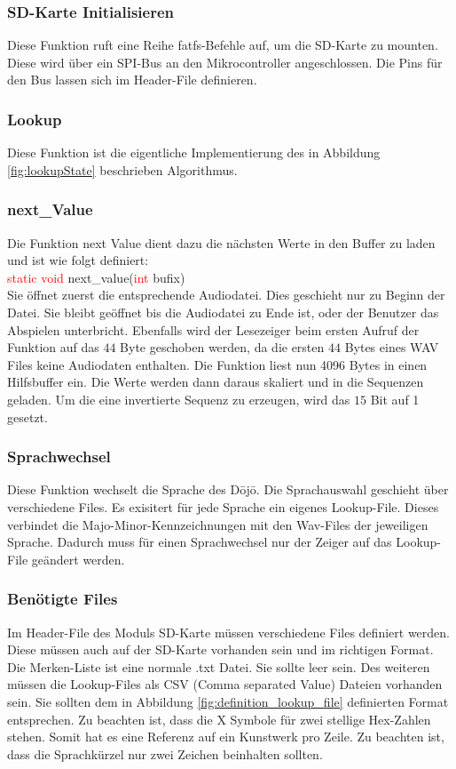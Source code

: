 \subsubsection*{SD-Karte Initialisieren}
Diese Funktion ruft eine Reihe fatfs-Befehle auf, um die SD-Karte zu mounten. Diese wird über ein SPI-Bus an den Mikrocontroller angeschlossen. Die Pins für den Bus lassen sich im Header-File definieren.

\subsubsection*{Lookup}
Diese Funktion ist die eigentliche Implementierung des in Abbildung \ref{fig:lookupState} beschrieben Algorithmus.

\subsubsection*{next\_Value}
Die Funktion next Value dient dazu die nächsten Werte in den Buffer zu laden und ist wie folgt definiert:\\
\textcolor{red}{static void} next\_value(\textcolor{red}{int} bufix)\\
Sie öffnet zuerst die entsprechende Audiodatei. Dies geschieht nur zu Beginn der Datei. Sie bleibt geöffnet bis die Audiodatei zu Ende ist, oder der Benutzer das Abspielen unterbricht. Ebenfalls wird der Lesezeiger beim ersten Aufruf der Funktion auf das $44$ Byte geschoben werden, da die ersten $44$ Bytes eines WAV Files keine Audiodaten enthalten. Die Funktion liest nun 4096 Bytes in einen Hilfsbuffer ein. Die Werte werden dann daraus skaliert und in die Sequenzen geladen. Um die eine invertierte Sequenz zu erzeugen, wird das $15$ Bit auf 1 gesetzt.

\subsubsection*{Sprachwechsel}
Diese Funktion wechselt die Sprache des Dōjō. Die Sprachauswahl geschieht über verschiedene Files. Es exisitert für jede Sprache ein eigenes Lookup-File. Dieses verbindet die Majo-Minor-Kennzeichnungen mit den Wav-Files der jeweiligen Sprache. Dadurch muss für einen Sprachwechsel nur der Zeiger auf das Lookup-File geändert werden.

\subsubsection{Benötigte Files}
Im Header-File des Moduls SD-Karte müssen verschiedene Files definiert werden. Diese müssen auch auf der SD-Karte vorhanden sein und im richtigen Format. Die Merken-Liste ist eine normale .txt Datei. Sie sollte leer sein. Des weiteren müssen die Lookup-Files als CSV (Comma separated Value) Dateien vorhanden sein. Sie sollten dem in Abbildung \ref{fig:definition_lookup_file} definierten Format entsprechen. Zu beachten ist, dass die X Symbole für zwei stellige Hex-Zahlen stehen. Somit hat es eine Referenz auf ein Kunstwerk pro Zeile. Zu beachten ist, dass die Sprachkürzel nur zwei Zeichen beinhalten sollten.

